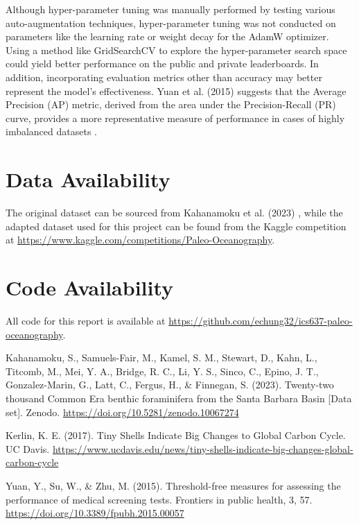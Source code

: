 \documentclass[letterpaper]{article}
\begin{document}
    Although hyper-parameter tuning was manually performed by testing various auto-augmentation techniques, hyper-parameter tuning was not conducted on parameters like the learning rate or weight decay for the AdamW optimizer. Using a method like GridSearchCV to explore the hyper-parameter search space could yield better performance on the public and private leaderboards. In addition, incorporating evaluation metrics other than accuracy may better represent the model’s effectiveness. Yuan et al. (2015) suggests that the Average Precision (AP) metric, derived from the area under the Precision-Recall (PR) curve, provides a more representative measure of performance in cases of highly imbalanced datasets \cite{yuan15}.

\section{Data Availability}
    The original dataset can be sourced from Kahanamoku et al. (2023) \cite{kahanamoku23}, while the adapted dataset used for this project can be found from the Kaggle competition at \url{https://www.kaggle.com/competitions/Paleo-Oceanography}.

\section{Code Availability}
    All code for this report is available at \url{https://github.com/echung32/ics637-paleo-oceanography}.

\begin{thebibliography}{9}
    Kahanamoku, S., Samuels-Fair, M., Kamel, S. M., Stewart, D., Kahn, L., Titcomb, M., Mei, Y. A., Bridge, R. C., Li, Y. S., Sinco, C., Epino, J. T., Gonzalez-Marin, G., Latt, C., Fergus, H., \& Finnegan, S. (2023). Twenty-two thousand Common Era benthic foraminifera from the Santa Barbara Basin [Data set]. Zenodo. \url{https://doi.org/10.5281/zenodo.10067274}
    
    Kerlin, K. E. (2017). Tiny Shells Indicate Big Changes to Global Carbon Cycle. UC Davis. \url{https://www.ucdavis.edu/news/tiny-shells-indicate-big-changes-global-carbon-cycle}

    Yuan, Y., Su, W., \& Zhu, M. (2015). Threshold-free measures for assessing the performance of medical screening tests. Frontiers in public health, 3, 57. \url{https://doi.org/10.3389/fpubh.2015.00057}

\end{thebibliography}
\end{document}
